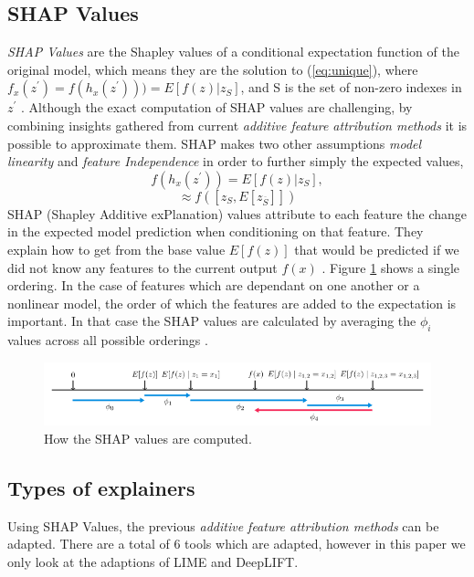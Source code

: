 \subsection{SHAP Values}
\emph{SHAP Values} are the Shapley values of a conditional expectation function of the original model, which means they are the solution to (\ref{eq:unique}), where $f_{x}(z^{'}) = f(h_{x}(z^{'}))) = E[f(z) | z_{S}]$, and S is the set of non-zero indexes in $z^{'}$ \cite{NIPS2017_7062}. Although the exact computation of SHAP values are challenging, by combining insights gathered from current \emph{additive feature attribution methods} it is possible to approximate them.
SHAP makes two other assumptions  \emph{model linearity} and \emph{feature Independence} in order to further simply the expected values,
\begin{equation*}
f(h_{x}(z^{'})) = E[f(z) | z_{S}],
\end{equation*}
\begin{equation}
\approx f([z_{S}, E[z_{\overline{S}}]])
\label{eq:summarized-unique}
\end{equation}
SHAP (Shapley Additive exPlanation) values attribute to each feature the change in the expected model prediction when conditioning on that feature.  They explain how to get from the base value $E[f(z)]$ that would be predicted if we did not know any features to the current output $f(x)$ \cite{NIPS2017_7062}. Figure \ref{fig:shap-values} shows a single ordering. In the case of features which are dependant on one another or a nonlinear model, the order of which the features are added to the expectation is important.  In that case the SHAP values are calculated by averaging the $\phi_{i}$ values across all possible orderings \cite{NIPS2017_7062}. 
\begin  {figure} [!htbp]
  \includegraphics[width=\linewidth]{Evaluation_Images/Shap_values.png}
  \caption{How the SHAP values are computed. \cite{NIPS2017_7062}}
  \label{fig:shap-values}
\end{figure}

\subsection{Types of explainers} \label{sect:shap-explainers}
Using SHAP Values, the previous \emph{additive feature attribution methods} can be adapted. There are a total of 6 tools which are adapted, however in this paper we only look at the adaptions of LIME and DeepLIFT\cite{DBLP:journals/corr/ShrikumarGK17}\cite{DBLP:journals/corr/ShrikumarGSK16}.

